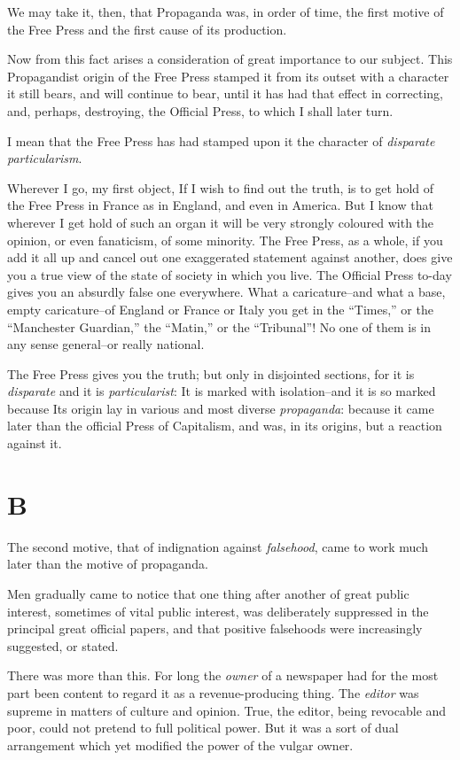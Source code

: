 \documentclass{book}
\begin{document}
We may take it, then, that Propaganda was, in order of time, the first motive of the Free Press and the first cause of its production.

Now from this fact arises a consideration of great importance to our subject. This Propagandist origin of the Free Press stamped it from its outset with a character it still bears, and will continue to bear, until it has had that effect in correcting, and, perhaps, destroying, the Official Press, to which I shall later turn.

I mean that the Free Press has had stamped upon it the character of \emph{disparate particularism}.

Wherever I go, my first object, If I wish to find out the truth, is to get hold of the Free Press in France as in England, and even in America. But I know that wherever I get hold of such an organ it will be very strongly coloured with the opinion, or even fanaticism, of some minority. The Free Press, as a whole, if you add it all up and cancel out one exaggerated statement against another, does give you a true view of the state of society in which you live. The Official Press to-day gives you an absurdly false one everywhere. What a caricature–and what a base, empty caricature–of England or France or Italy you get in the “Times,” or the “Manchester Guardian,” the “Matin,” or the “Tribunal”! No one of them is in any sense general–or really national.

The Free Press gives you the truth; but only in disjointed sections, for it is \emph{disparate} and it is \emph{particularist}: It is marked with isolation–and it is so marked because Its origin lay in various and most diverse \emph{propaganda}: because it came later than the official Press of Capitalism, and was, in its origins, but a reaction against it.

\section*{B}
The second motive, that of indignation against \emph{falsehood}, came to work much later than the motive of propaganda.

Men gradually came to notice that one thing after another of great public interest, sometimes of vital public interest, was deliberately suppressed in the principal great official papers, and that positive falsehoods were increasingly suggested, or stated.

There was more than this. For long the \emph{owner} of a newspaper had for the most part been content to regard it as a revenue-producing thing. The \emph{editor} was supreme in matters of culture and opinion. True, the editor, being revocable and poor, could not pretend to full political power. But it was a sort of dual arrangement which yet modified the power of the vulgar owner.
\end{document}
